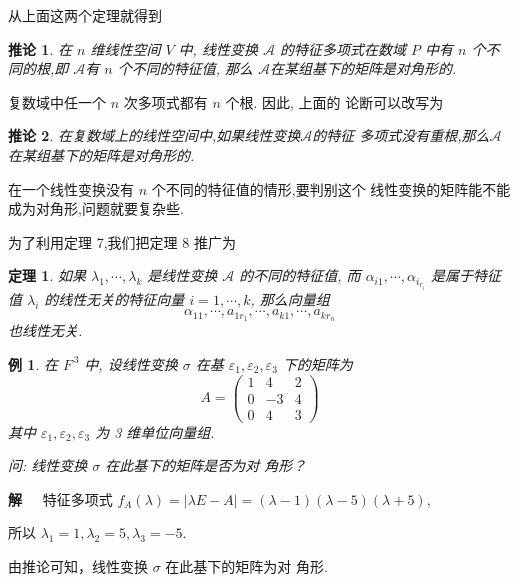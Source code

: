 \documentclass[13pt]{beamer}
\newtheorem{thm}{定理}
\newtheorem{exa}{例}
\newtheorem*{coro}{推论}
\def\sol{{\bf 解~~ }}
\def\A{\mathscr{A}}
\begin{document}
\begin{frame}
从上面这两个定理就得到

\begin{coro}
	在 $n$ 维线性空间 $V$ 中, 线性变换 $\A$ 的特征多项式在数域 $P$ 中有 $n$ 个不同的根,即 $\A$有 $n$ 个不同的特征值, 那么 $\A$在某组基下的矩阵是对角形的.
\end{coro}

复数域中任一个 $n$ 次多项式都有 $n$ 个根. 因此, 上面的 论断可以改写为 
\begin{coro}
	在复数域上的线性空间中,如果线性变换$\A$的特征 多项式没有重根,那么$\A$在某组基下的矩阵是对角形的. 
\end{coro}
\end{frame}

\begin{frame}
 在一个线性变换没有 $n$ 个不同的特征值的情形,要判别这个 线性变换的矩阵能不能成为对角形,问题就要复杂些.
 
 为了利用定理 7,我们把定理 8 推广为 
\begin{thm}
	如果 $\lambda_{1}, \cdots, \lambda_{k}$ 是线性变换 $\A$ 的不同的特征值, 
	而 ${\alpha}_{i 1}, \cdots, {\alpha}_{i_{r_i}}$ 是属于特征值 $\lambda_{i}$ 的线性无关的特征向量 $i=1, \cdots, k$, 
	那么向量组 $${\alpha}_{11}, \cdots, {a}_{1 r_{1}}, \cdots, {a}_{k 1}, \cdots, {a}_{k r_{n}}$$ 也线性无关.
\end{thm}
\end{frame}


\begin{frame}
\begin{exa}
	在 $F^{\, 3}$ 中, 设线性变换 $\sigma$ 在基 $\varepsilon_{1}, \varepsilon_{2}, \varepsilon_{3}$ 下的矩阵为
	\[
	A=\left(\begin{array}{ccc}
	1 & 4 & 2 \\
	0 & -3 & 4 \\
	0 & 4 & 3
	\end{array}\right)
	\]
	其中 $\varepsilon_{1}, \varepsilon_{2}, \varepsilon_{3}$ 为 3 维单位向量组.	
	
	问: 线性变换 $\sigma$ 在此基下的矩阵是否为对 角形？
\end{exa}
\pause
\sol 特征多项式 $f_{A}(\lambda)=|\lambda E-A|=(\lambda-1)(\lambda-5)(\lambda+5),$

 所以 $\lambda_{1}=1, \lambda_{2}=5, \lambda_{3}=-5.$

由推论可知，线性变换 $\sigma$ 在此基下的矩阵为对 角形.
\end{frame}
\end{document}

